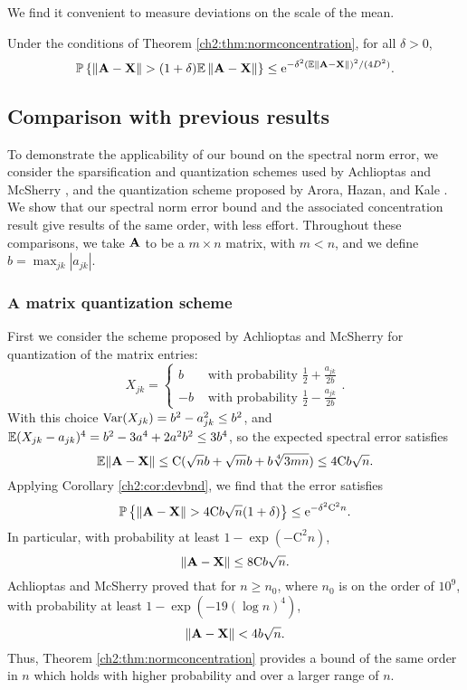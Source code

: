 We find it convenient to measure deviations on the scale of the mean.
\begin{cor}
Under the conditions of Theorem \ref{ch2:thm:normconcentration}, for all
$\delta>0$, 
\[
\Prob{\norm{\mat{A}-\mat{X}}>(1+\delta)\mathbb{E}\norm{\mat{A}-\mat{X}}}\leq
\e^{-\delta^{2}\left(\mathbb{E}\norm{\mat{A}-\mat{X}}\right)^{2}/(4D^{2})}.
\]
\label{ch2:cor:devbnd}
\end{cor}

\subsection{Comparison with previous results}

To demonstrate the applicability of our bound on the spectral norm error, we
consider the sparsification and quantization schemes used by Achlioptas and
McSherry \cite{AM07}, and the quantization scheme proposed by Arora, Hazan, and
Kale \cite{AHK06}. We show that our spectral norm error bound and the associated
concentration result give results of the same order, with less effort.
Throughout these comparisons, we take $\mathbf{A}$ to be a $m\times n$ matrix, with
$m<n$, and we define $b=\max_{jk}|a_{jk}|$.


\subsubsection{A matrix quantization scheme}

First we consider the scheme proposed by Achlioptas and McSherry for
quantization of the matrix entries: 
\[
X_{jk}=\begin{cases}
b & \text{ with probability }\frac{1}{2}+\frac{a_{jk}}{2b}\\
-b & \text{ with probability }\frac{1}{2}-\frac{a_{jk}}{2b}\end{cases}.
\]
With this choice $\operatorname{Var}(X_{jk})=b^{2}-a_{jk}^{2}\leq b^{2}$, and
$\mathbb{E}(X_{jk}-a_{jk})^{4}=b^{2}-3a^{4}+2a^{2}b^{2}\leq3b^{4}$, so the expected
spectral error satisfies 
\[
\mathbb{E}\Vert\mathbf{A}-\mathbf{X}\Vert\leq
\mathrm{C}(\sqrt{n}b+\sqrt{m}b+b\sqrt[4]{3mn})\leq4\mathrm{C}b\sqrt{n}.
\]
Applying Corollary \ref{ch2:cor:devbnd}, we find that the error satisfies 
\[
\Prob{\norm{\mat{A}-\mat{X}}>4\mathrm{C}b\sqrt{n}(1 + \delta)}\leq
\e^{-\delta^{2}\mathrm{C}^{2}n}.
\]
In particular, with probability at least $1-\exp(-\mathrm{C}^{2}n)$,
\[
\left\|\mathbf{A}-\mathbf{X}\right\|\leq8\mathrm{C}b\sqrt{n}.
\]
Achlioptas and McSherry proved that for $n\geq n_{0}$, where $n_{0}$ is on the
order of $10^{9}$, with probability at least $1-\exp(-19(\log n)^{4})$,
\[
\left\|\mathbf{A}-\mathbf{X}\right\|<4b\sqrt{n}.
\]
Thus, Theorem \ref{ch2:thm:normconcentration} provides a bound of the same order in
$n$ which holds with higher probability and over a larger range of $n$.


